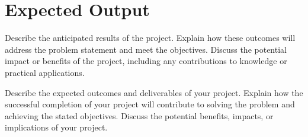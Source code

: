 \section{Expected Output}
Describe the anticipated results of the project. Explain how these outcomes will address the problem statement and meet the objectives. Discuss the potential impact or benefits of the project, including any contributions to knowledge or practical applications.

Describe the expected outcomes and deliverables of your project. Explain how the successful completion of your project will contribute to solving the problem and achieving the stated objectives. Discuss the potential benefits, impacts, or implications of your project.